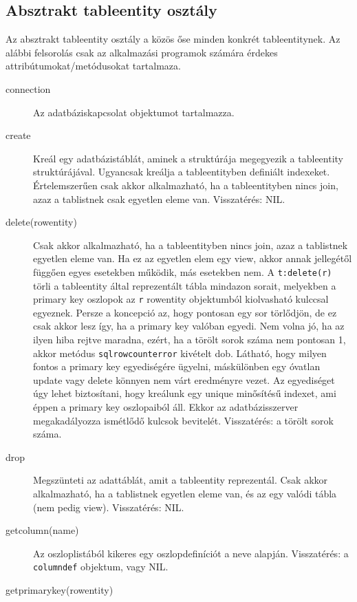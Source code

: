 \subsection{Absztrakt tableentity osztály}

Az absztrakt tableentity osztály a közös őse minden
konkrét tableentitynek. Az alábbi felsorolás csak 
az alkalmazási programok számára érdekes attribútumokat/metódusokat
tartalmaza.

\begin{description}
\item[connection]
    Az adatbáziskapcsolat objektumot tartalmazza.
\item[create]
    Kreál egy adatbázistáblát, aminek a struktúrája megegyezik
    a tableentity struktúrájával. Ugyancsak kreálja a tableentityben
    definiált indexeket.
    Értelemszerűen csak akkor alkalmazható, 
    ha a tableentityben nincs join, 
    azaz a tablistnek csak egyetlen eleme van.
    Visszatérés: NIL.
\item[delete(rowentity)]
    Csak akkor alkalmazható, ha a tableentityben nincs join, 
    azaz a tablistnek egyetlen eleme van. Ha ez az egyetlen elem egy view, 
    akkor annak jellegétől függően egyes esetekben működik, más esetekben nem.
    A \verb!t:delete(r)! törli a tableentity által reprezentált
    tábla mindazon sorait, melyekben a primary key oszlopok
    az \verb!r! rowentity objektumból kiolvasható kulccsal egyeznek.
    Persze a koncepció az, hogy pontosan egy sor törlődjön,
    de ez csak akkor lesz így, ha a primary key valóban  egyedi. 
    Nem volna jó, ha az ilyen hiba rejtve maradna, ezért, ha a törölt 
    sorok száma nem pontosan 1, akkor metódus \verb!sqlrowcounterror! 
    kivételt dob.  Látható, hogy milyen fontos a primary key
    egyediségére ügyelni, máskülönben egy óvatlan update vagy delete
    könnyen nem várt eredményre vezet. Az egyediséget úgy lehet
    biztosítani, hogy kreálunk egy unique minősítésű indexet,
    ami éppen a primary key oszlopaiból áll. Ekkor az adatbázisszerver
    megakadályozza ismétlődő kulcsok bevitelét. 
    Visszatérés: a törölt sorok száma. 
\item[drop]
    Megszünteti az adattáblát, 
    amit a tableentity reprezentál. 
    Csak akkor alkalmazható, ha a tablistnek egyetlen eleme van,
    és az egy valódi tábla (nem pedig view).
    Visszatérés: NIL.
\item[getcolumn(name)]
    Az oszloplistából kikeres egy oszlopdefiníciót a neve alapján.
    Visszatérés: a \verb!columndef! objektum, vagy NIL.
\item[getprimarykey(rowentity)]

\end{description}
